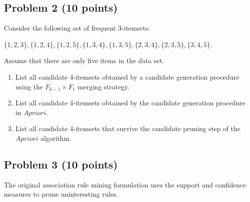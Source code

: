 \documentclass[12pt]{article}
\begin{document}
\subsection*{Problem 2 (10 points)}

Consider the following set of frequent 3-itemsets:
\begin{center}
$\{1, 2, 3\} , \{ 1 , 2 , 4 \} , \{ 1 , 2 , 5 \} , \{ 1 , 3 , 4 \} , \{ 1 ,3 , 5 \} , \{ 2 , 3 , 4 \} , \{ 2 , 3 , 5 \} , \{ 3 , 4 , 5 \}$.
\end{center}

Assume that there are only five items in the data set.

\begin{enumerate}[label=(\alph*)]
  \item List all candidate 4-itemsets obtained by a candidate generation procedure using the $F_{k-1} \times F_{1}$ merging strategy.
  \item List all candidate 4-itemsets obtained by the candidate generation procedure in $Apriori$.
  \item List all candidate 4-itemsets that survive the candidate pruning step of the $Apriori$ algorithm.
\end{enumerate}

\subsection*{Problem 3 (10 points)}

The original association rule mining formulation uses the support and confidence measures to prune uninteresting rules.
\end{document}
